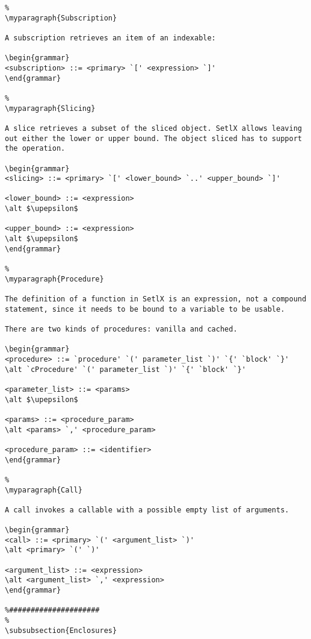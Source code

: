 \begin{verbatim}
%
\myparagraph{Subscription}

A subscription retrieves an item of an indexable:

\begin{grammar}
<subscription> ::= <primary> `[' <expression> `]'
\end{grammar}

%
\myparagraph{Slicing}

A slice retrieves a subset of the sliced object. SetlX allows leaving out either the lower or upper bound. The object sliced has to support the operation.

\begin{grammar}
<slicing> ::= <primary> `[' <lower_bound> `..' <upper_bound> `]'

<lower_bound> ::= <expression>
\alt $\upepsilon$

<upper_bound> ::= <expression>
\alt $\upepsilon$
\end{grammar}

%
\myparagraph{Procedure}

The definition of a function in SetlX is an expression, not a compound statement, since it needs to be bound to a variable to be usable.

There are two kinds of procedures: vanilla and cached.

\begin{grammar}
<procedure> ::= `procedure' `(' parameter_list `)' `{' `block' `}'
\alt `cProcedure' `(' parameter_list `)' `{' `block' `}'

<parameter_list> ::= <params>
\alt $\upepsilon$

<params> ::= <procedure_param>
\alt <params> `,' <procedure_param>

<procedure_param> ::= <identifier>
\end{grammar}

%
\myparagraph{Call}

A call invokes a callable with a possible empty list of arguments.

\begin{grammar}
<call> ::= <primary> `(' <argument_list> `)'
\alt <primary> `(' `)'

<argument_list> ::= <expression>
\alt <argument_list> `,' <expression>
\end{grammar}

%#####################
%
\subsubsection{Enclosures}


\end{verbatim}
